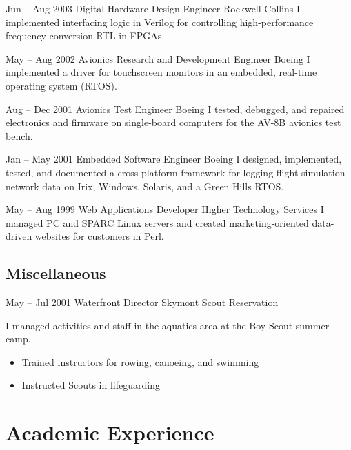 \documentclass[11pt,a4paper,roman]{moderncv}
\begin{document}
\cventry%
{Jun -- Aug 2003}%
{Digital Hardware Design Engineer}%
{Rockwell Collins}%
{\whitemarsh}%
{}%
{I implemented interfacing logic in Verilog for controlling high-performance frequency conversion RTL in FPGAs.}

\cventry%
{May -- Aug 2002}%
{Avionics Research and Development Engineer}%
{Boeing}%
{\stlouis}%
{}%
{I implemented a driver for touchscreen monitors in an embedded, real-time operating system (RTOS).}

\cventry%
{Aug -- Dec 2001}%
{Avionics Test Engineer}%
{Boeing}%
{\stlouis}%
{}%
{I tested, debugged, and repaired electronics and firmware on single-board computers for the AV-8B avionics test bench.}

\cventry%
{Jan -- May 2001}%
{Embedded Software Engineer}%
{Boeing}%
{\stlouis}%
{}%
{I designed, implemented, tested, and documented a cross-platform \Cpp framework for logging flight simulation network data on Irix, Windows, Solaris, and a Green Hills RTOS.}

\cventry%
{May -- Aug 1999}%
{Web Applications Developer}%
{Higher Technology Services}%
{\chattanooga}%
{}%
{I managed PC and SPARC Linux servers and created marketing-oriented data-driven websites for customers in Perl.}


\subsection{Miscellaneous}

\cventry%
{May -- Jul 2001}%
{Waterfront Director}%
{Skymont Scout Reservation}%
{\altamont}%
{}%
{I managed activities and staff in the aquatics area at the Boy Scout summer camp.
\begin{itemize}
\item Trained instructors for rowing, canoeing, and swimming
\item Instructed Scouts in lifeguarding
\end{itemize}}


\section{Academic Experience}

\newcommand\coursenote{\scriptsize [U]ndergraduate and [G]raduate courses (with year)}
\end{document}
